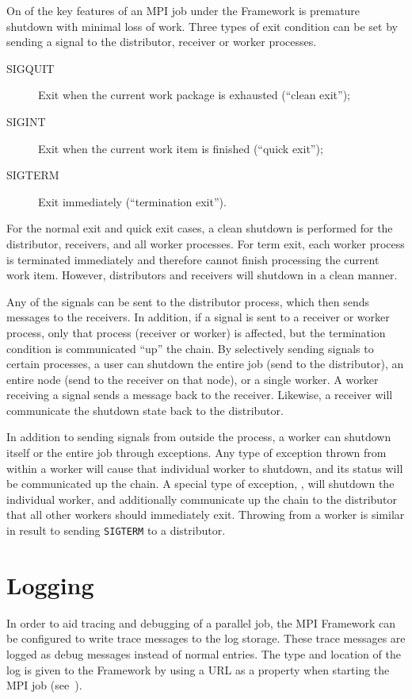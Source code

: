 On of the key features of an MPI job under the Framework is premature shutdown
with minimal loss of work. Three types of exit condition can be set by sending
a signal to the distributor, receiver or worker processes. 

\begin{description}
\item[SIGQUIT] Exit when the current work package is exhausted (``clean exit'');
\item[SIGINT] Exit when the current work item is finished (``quick exit'');
\item[SIGTERM] Exit immediately (``termination exit'').
\end{description}

For the normal exit and quick exit cases, a clean shutdown is performed for
the distributor, receivers, and all worker processes. For term exit, each
worker process is terminated immediately and therefore cannot finish processing
the current work item. However, distributors and receivers will shutdown in a
clean manner.

Any of the signals can be sent to the distributor process, which then sends
messages to the receivers. In addition, if a signal is sent to a receiver or
worker process, only that process (receiver or worker) is affected, but the
termination condition is communicated ``up'' the chain. By selectively sending
signals to certain processes, a user can shutdown the entire job (send to the
distributor), an entire node (send to the receiver on that node), or a single
worker. A worker receiving a signal sends a message back to the receiver.
Likewise, a receiver will communicate the shutdown state back to the
distributor.

In addition to sending signals from outside the process, a worker can shutdown
itself or the entire job through exceptions. Any type of exception thrown
from within a worker will cause that individual worker to shutdown, and its
status will be communicated up the chain. A special type of exception,
, will shutdown the individual worker, and additionally
communicate up the chain to the distributor that all other workers should
immediately exit. Throwing  from a worker is similar in
result to sending \texttt{SIGTERM} to a distributor.

\section{Logging}
\label{sec-mpilogging}
In order to aid tracing and debugging of a parallel job, the MPI Framework
can be configured to write trace messages to the log storage. These trace
messages are logged as debug messages instead of normal entries.
The type and location of the log is given to the 
Framework by using a URL as a property when starting the MPI
job (see~).

